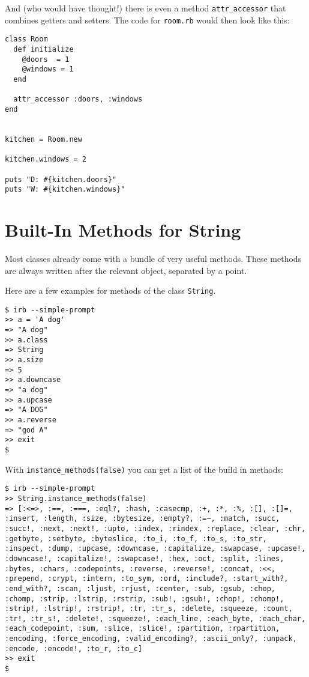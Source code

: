 \documentclass[a4paper]{book}
\begin{document}
And (who would have thought!) there is even a method \texttt{attr\_accessor} that combines getters and setters. The code for \texttt{room.rb} would then look like this:

\begin{shaded}\begin{verbatim}
class Room
  def initialize
    @doors  = 1
    @windows = 1
  end

  attr_accessor :doors, :windows
end


kitchen = Room.new

kitchen.windows = 2

puts "D: #{kitchen.doors}"
puts "W: #{kitchen.windows}"
\end{verbatim}\end{shaded}

\section{Built-In Methods for String}\label{built-in-methods-for-string}

Most classes already come with a bundle of very useful methods. These methods are always written after the relevant object, separated by a point.

Here are a few examples for methods of the class \texttt{String}.

\begin{shaded}\begin{verbatim}
$ irb --simple-prompt
>> a = 'A dog'
=> "A dog"
>> a.class
=> String
>> a.size
=> 5
>> a.downcase
=> "a dog"
>> a.upcase
=> "A DOG"
>> a.reverse
=> "god A"
>> exit
$
\end{verbatim}\end{shaded}

With \texttt{instance\_methods(false)} you can get a list of the build in methods:

\begin{shaded}\begin{verbatim}
$ irb --simple-prompt
>> String.instance_methods(false)
=> [:<=>, :==, :===, :eql?, :hash, :casecmp, :+, :*, :%, :[], :[]=, :insert, :length, :size, :bytesize, :empty?, :=~, :match, :succ, :succ!, :next, :next!, :upto, :index, :rindex, :replace, :clear, :chr, :getbyte, :setbyte, :byteslice, :to_i, :to_f, :to_s, :to_str, :inspect, :dump, :upcase, :downcase, :capitalize, :swapcase, :upcase!, :downcase!, :capitalize!, :swapcase!, :hex, :oct, :split, :lines, :bytes, :chars, :codepoints, :reverse, :reverse!, :concat, :<<, :prepend, :crypt, :intern, :to_sym, :ord, :include?, :start_with?, :end_with?, :scan, :ljust, :rjust, :center, :sub, :gsub, :chop, :chomp, :strip, :lstrip, :rstrip, :sub!, :gsub!, :chop!, :chomp!, :strip!, :lstrip!, :rstrip!, :tr, :tr_s, :delete, :squeeze, :count, :tr!, :tr_s!, :delete!, :squeeze!, :each_line, :each_byte, :each_char, :each_codepoint, :sum, :slice, :slice!, :partition, :rpartition, :encoding, :force_encoding, :valid_encoding?, :ascii_only?, :unpack, :encode, :encode!, :to_r, :to_c]
>> exit
$
\end{verbatim}\end{shaded}
\end{document}
